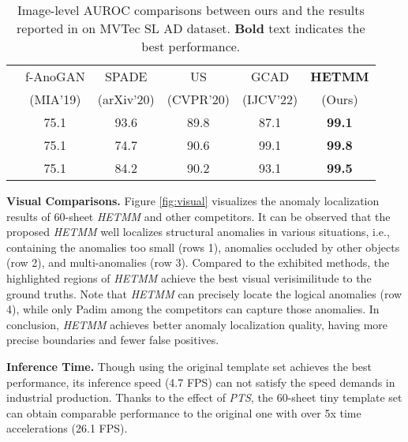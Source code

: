 \documentclass[default,iicol]{sn-jnl}\usepackage[algo2e,ruled,linesnumbered]{algorithm2e}
\theoremstyle{thmstyleone}\newtheorem{theorem}{Theorem}\newtheorem{proposition}[theorem]{Proposition}
\theoremstyle{thmstyletwo}\newtheorem{example}{Example}\newtheorem{remark}{Remark}
\theoremstyle{thmstylethree}\newtheorem{definition}{Definition}
\begin{document}
\begin{table}[!t]
    \caption{
    Image-level AUROC comparisons between ours and the results reported in \cite{MVTECLOCO} on MVTec SL AD dataset.
    \textbf{Bold} text indicates the best performance.
    }
    \tiny
    \centering
    \setlength{\tabcolsep}{0.7mm}
    \begin{tabular}{c|ccccc}
        \hline
        \multirow{2}{*}{} &f-AnoGAN\cite{F-AnoGan} &SPADE\cite{SPADE}  &US\cite{US}   &GCAD\cite{MVTECLOCO}  &\textbf{HETMM} \\
                          &(MIA'19)              &(arXiv'20)         &(CVPR'20)     &(IJCV'22) &(Ours)        \\\hline
             &75.1                 &93.6              &89.8         &87.1            &\textbf{99.1} \\
             &75.1                 &74.7              &90.6         &99.1            &\textbf{99.8} \\\hline
                    &75.1                 &84.2              &90.2         &93.1            &\textbf{99.5} \\\hline
    \end{tabular}
    \label{table:MVTECSL}
\end{table}

\noindent\textbf{Visual Comparisons. }
Figure \ref{fig:visual} visualizes the anomaly localization results of 60-sheet \textit{HETMM} and other competitors.
It can be observed that the proposed \textit{HETMM} well localizes structural anomalies in various situations, i.e., containing the anomalies too small (rows 1), anomalies occluded by other objects (row 2), and multi-anomalies (row 3).
Compared to the exhibited methods, the highlighted regions of \textit{HETMM} achieve the best visual verisimilitude to the ground truths.
Note that \textit{HETMM} can precisely locate the logical anomalies (row 4), while only Padim \cite{Padim} among the competitors can capture those anomalies.
In conclusion, \textit{HETMM} achieves better anomaly localization quality, having more precise boundaries and fewer false positives.

\noindent\textbf{Inference Time. }
Though using the original template set achieves the best performance, its inference speed (4.7 FPS) can not satisfy the speed demands in industrial production.
Thanks to the effect of \textit{PTS}, the 60-sheet tiny template set can obtain comparable performance to the original one with over 5x time accelerations (26.1 FPS).
\end{document}
